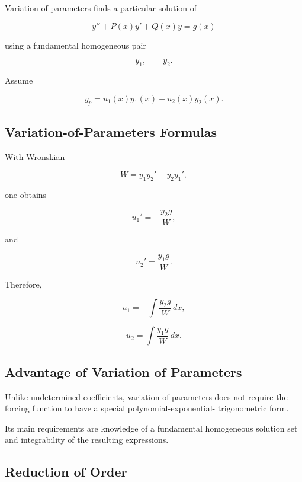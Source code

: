 Variation of parameters finds a particular solution of

\[
\boxed{
y''
+
P(x)y'
+
Q(x)y
=
g(x)
}
\]

using a fundamental homogeneous pair

\[
y_1,
\qquad
y_2.
\]

Assume

\[
\boxed{
y_p
=
u_1(x)y_1(x)
+
u_2(x)y_2(x).
}
\]

\subsection{Variation-of-Parameters Formulas}
\label{subsec:variation-parameters-formulas}

With Wronskian

\[
W
=
y_1y_2'
-
y_2y_1',
\]

one obtains

\[
\boxed{
u_1'
=
-
\frac{
y_2g
}{
W
},
}
\]

and

\[
\boxed{
u_2'
=
\frac{
y_1g
}{
W
}.
}
\]

Therefore,

\[
\boxed{
u_1
=
-
\int
\frac{
y_2g
}{
W
}
\,dx,
}
\]

\[
\boxed{
u_2
=
\int
\frac{
y_1g
}{
W
}
\,dx.
}
\]

\subsection{Advantage of Variation of Parameters}
\label{subsec:variation-parameters-advantage}

Unlike undetermined coefficients, variation of parameters does not
require the forcing function to have a special polynomial-exponential-
trigonometric form.

Its main requirements are knowledge of a fundamental homogeneous
solution set and integrability of the resulting expressions.

\subsection{Reduction of Order}
\label{subsec:reduction-of-order}

